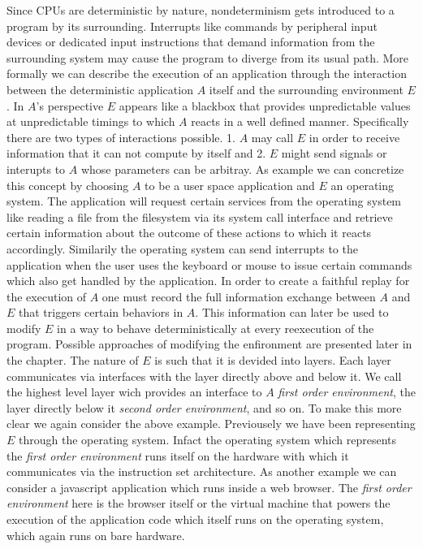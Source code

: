 \documentclass[11pt,a4paper]{book}
\begin{document}
Since CPUs are deterministic by nature, nondeterminism gets introduced to a
program by its surrounding. Interrupts like commands by peripheral input
devices or dedicated input instructions that demand information from the
surrounding system may cause the program to diverge from its usual path.
More formally we can describe the execution of an application through the
interaction between the deterministic application $A$ itself and the surrounding
environment $E$. In $A$'s perspective $E$ appears like a blackbox that
provides unpredictable values at unpredictable timings to which $A$ reacts
in a well defined manner. Specifically there are two types of interactions
possible. 1. $A$ may call $E$ in order to receive information that it can
not compute by itself and 2. $E$ might send signals or interupts to $A$
whose parameters can be arbitray. As example we can concretize this concept
by choosing $A$ to be a user space application and $E$ an operating system.
The application will request certain services from the operating system like
reading a file from the filesystem via its system call interface and retrieve
certain information about the outcome of these actions to which it reacts
accordingly. Similarily the operating system can send interrupts to the
application when the user uses the keyboard or mouse to issue certain commands
which also get handled by the application. In order to create a faithful
replay for the execution of $A$ one must record the full information exchange
between $A$ and $E$ that triggers certain behaviors in $A$. This information
can later be used to modify $E$ in a way to behave deterministically at
every reexecution of the program. Possible approaches of modifying the
enfironment are presented later in the chapter.
The nature of $E$ is such that
it is devided into layers. Each layer communicates via interfaces with the
layer directly above and below it. We call the highest level layer wich
provides an interface to $A$ \textit{first order environment}, the layer
directly below it \textit{second order environment}, and so on. To make this
more clear we again consider the above example. Previousely we have been
representing $E$ through the operating system. Infact the operating system
which represents the \textit{first order environment} runs itself on the
hardware with which it communicates via the instruction set architecture.
As another example we can consider a javascript application which runs
inside a web browser. The \textit{first order environment} here is the
browser itself or the virtual machine that powers the execution of the
application code which itself runs on the operating system, which again
runs on bare hardware.
\end{document}
